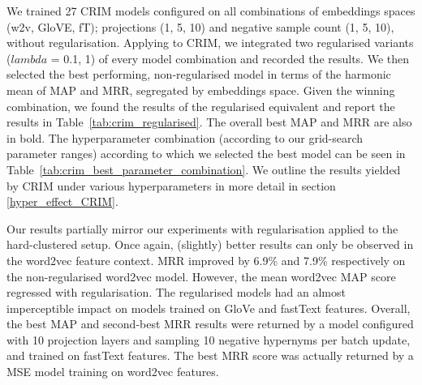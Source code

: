We trained 27 CRIM models configured on all combinations of embeddings spaces (w2v, GloVE, fT); projections (1, 5, 10) and negative sample count (1, 5, 10), without regularisation.  Applying \citep{ustalov2017negative} to CRIM, we integrated two regularised variants ($lambda$ = 0.1, 1) of every model combination and recorded the results.  We then selected the best performing, non-regularised model in terms of the harmonic mean of \ac{MAP} and \ac{MRR}, segregated by embeddings space.  Given the winning combination, we found the results of the regularised equivalent and report the results in Table~\ref{tab:crim_regularised}.  The overall best \ac{MAP} and \ac{MRR} are also in bold.  The hyperparameter combination (according to our grid-search parameter ranges) according to which we selected the best model can be seen in Table~\ref{tab:crim_best_parameter_combination}.  We outline the results yielded by CRIM under various hyperparameters in more detail in section \ref{hyper_effect_CRIM}.

Our results partially mirror our experiments with regularisation applied to the hard-clustered setup.  Once again, (slightly) better results can only be observed in the word2vec feature context.  \ac{MRR} improved by 6.9\% and 7.9\% respectively on the non-regularised word2vec model.  However, the mean word2vec \ac{MAP} score regressed with regularisation.  The regularised models had an almost imperceptible impact on models trained on GloVe and fastText features.  Overall, the best \ac{MAP} and second-best \ac{MRR} results were returned by a model configured with 10 projection layers and sampling 10 negative hypernyms per batch update, and trained on fastText features.  The best \ac{MRR} score was actually returned by a \ac{MSE} model training on word2vec features.

